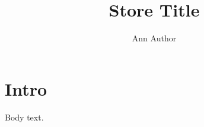 \documentclass{jpsj2}
\title{Store Title}
\author{Ann Author}
\begin{document}
\maketitle
\section{Intro}
Body text.
\end{document}

